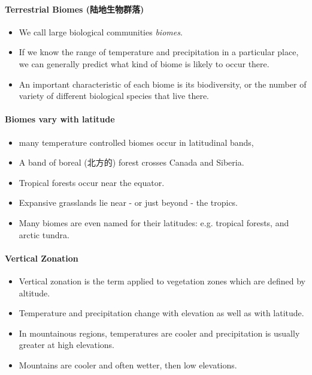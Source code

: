 \documentclass[10pt]{article}
\begin{document}
\paragraph{Terrestrial Biomes (陆地生物群落)}
\begin{itemize}
    \item We call large biological communities \textit{biomes}.
    \item If we know the range of temperature and precipitation in a particular place, we can generally predict what kind of biome is likely to occur there. 
    \item An important characteristic of each biome is its biodiversity, or the number of variety of different biological species that live there. 
\end{itemize}

\paragraph{Biomes vary with latitude}
\begin{itemize}
    \item many temperature controlled biomes occur in latitudinal bands, 
    \item A band of boreal (北方的) forest crosses Canada and Siberia. 
    \item Tropical forests occur near the equator. 
    \item Expansive grasslands lie near - or just beyond - the tropics. 
    \item Many biomes are even named for their latitudes: e.g. tropical forests, and arctic tundra. 
\end{itemize}

\paragraph{Vertical Zonation}
\begin{itemize}
    \item Vertical zonation is the term applied to vegetation zones which are defined by altitude.
    \item Temperature and precipitation change with elevation as well as with latitude. 
    \item In mountainous regions, temperatures are cooler and precipitation is usually greater at high elevations. 
    \item Mountains are cooler and often wetter, then low elevations. 
\end{itemize}
\end{document}
